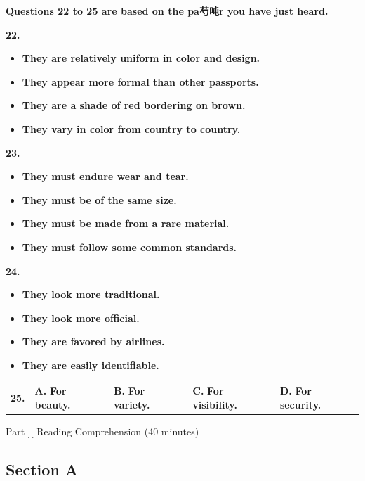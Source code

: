 \documentclass[UTF8,11pt]{ctexart}
\begin{document}
\textbf{Questions 22 to 25 are based on the pa芍吨r you have just heard.}


\textbf{22.}


\begin{itemize}[leftmargin=2em,itemsep=.2em,topsep=.4em]\item[A.] \textbf{They are relatively uniform in color and design.}
\item[B.] \textbf{They appear more formal than other passports.}
\item[C.] \textbf{They are a shade of red bordering on brown.}
\item[D.] \textbf{They vary in color from country to country.}
\end{itemize}

\textbf{23.}


\begin{itemize}[leftmargin=2em,itemsep=.2em,topsep=.4em]\item[A.] \textbf{They must endure wear and tear.}
\item[B.] \textbf{They must be of the same size.}
\item[C.] \textbf{They must be made from a rare material.}
\item[D.] \textbf{They must follow some common standards.}
\end{itemize}

\textbf{24.}


\begin{itemize}[leftmargin=2em,itemsep=.2em,topsep=.4em]\item[A.] \textbf{They look more traditional.}
\item[B.] \textbf{They look more official.}
\item[C.] \textbf{They are favored by airlines.}
\item[D.] \textbf{They are easily identifiable.}
\end{itemize}

\noindent\begin{tabularx}{\linewidth}{@{}lXXXX@{}}\textbf{25.} & \textbf{A.} \textbf{For beauty.} & \textbf{B.} \textbf{For variety.} & \textbf{C.} \textbf{For visibility.} & \textbf{D.} \textbf{For security.}\\\end{tabularx}\par

Part ][ Reading Comprehension (40 minutes)


\subsection*{Section A}
\end{document}
